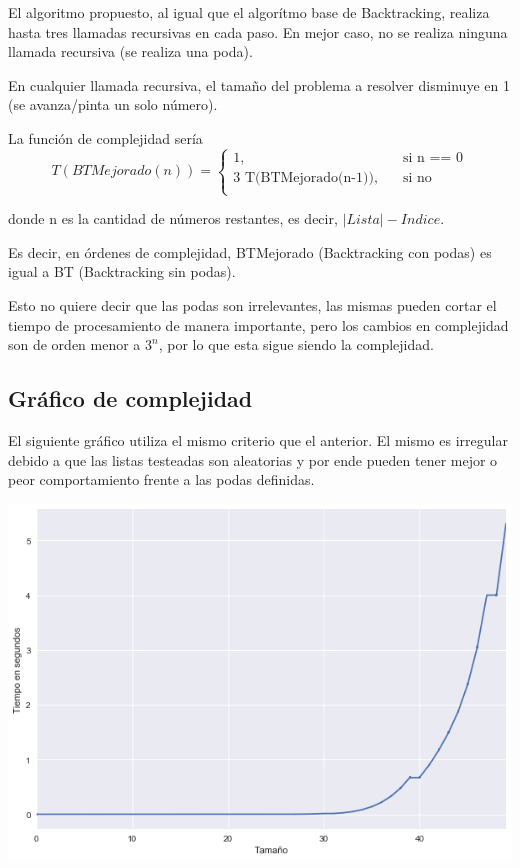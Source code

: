 	El algoritmo propuesto, al igual que el algorítmo base de Backtracking, realiza hasta tres llamadas recursivas en cada paso. En mejor caso, no se realiza ninguna llamada recursiva (se realiza una poda).

	En cualquier llamada recursiva, el tamaño del problema a resolver disminuye en 1 (se avanza/pinta un solo número).

	La función de complejidad sería
	\[
	T(BTMejorado(n)) =
		\begin{cases}
			\text{1,} &\quad\text{si n == 0}\\
			\text{3 T(BTMejorado(n-1)),} &\quad\text{si no} \\
		\end{cases}
	\]

	donde n es la cantidad de números restantes, es decir, $|Lista| - Indice$.

	Es decir, en órdenes de complejidad, BTMejorado (Backtracking con podas) es igual a BT (Backtracking sin podas).

	Esto no quiere decir que las podas son irrelevantes, las mismas pueden cortar el tiempo de procesamiento de manera importante, pero los cambios en complejidad son de orden menor a $3^n$, por lo que esta sigue siendo la complejidad.

	\pagebreak
	\subsection{Gráfico de complejidad}

	El siguiente gráfico utiliza el mismo criterio que el anterior. El mismo es irregular debido a que las listas testeadas son aleatorias y por ende pueden tener mejor o peor comportamiento frente a las podas definidas.

	\begin{center}
	\includegraphics[width=.8\textwidth]{ej2.png}
	\end{center}

